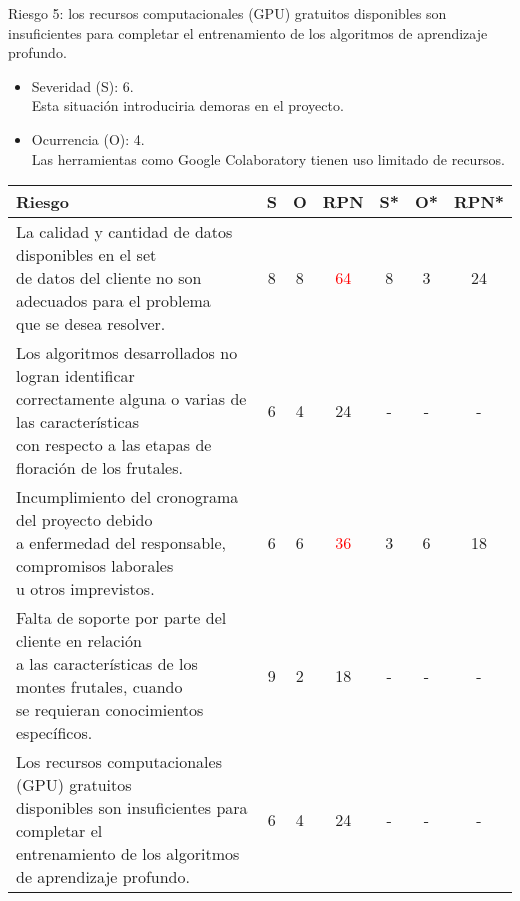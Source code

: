\documentclass[
11pt, %
]{charter}
\begin{document}
Riesgo 5: los recursos computacionales (GPU) gratuitos disponibles son insuficientes para
completar el entrenamiento de los algoritmos de aprendizaje profundo.
\begin{itemize}
	\item Severidad (S):  6.\\
	Esta situación introduciria demoras en el proyecto.
	\item Ocurrencia (O): 4.\\
	Las herramientas como Google Colaboratory tienen uso limitado de recursos.
\end{itemize}


\begin{table}[htpb]
\centering
\begin{tabularx}{\linewidth}{@{}|X|c|c|c|c|c|c|@{}}
\hline
\rowcolor[HTML]{C0C0C0} 
    Riesgo & S & O & RPN & S* & O* & RPN* \\ \hline
    
    \makecell[l]{La calidad y cantidad de datos disponibles en el set \\ de datos del cliente no son adecuados para el problema \\ que se desea resolver.} & 8 & 8 & \textcolor{red}{64} & 8 & 3 & 24 \\ \hline
    
    \makecell[l]{Los algoritmos desarrollados no logran identificar \\ correctamente alguna o varias de las características \\ con respecto a las etapas de floración de los frutales.} & 6 & 4 & 24 & - & - & - \\ \hline
    
    \makecell[l]{Incumplimiento del cronograma del proyecto debido \\ a enfermedad del responsable, compromisos laborales \\ u otros imprevistos.} & 6 & 6 & \textcolor{red}{36}& 3 & 6 & 18 \\ \hline
    
    \makecell[l]{Falta de soporte por parte del cliente en relación \\ a las características de los montes frutales, cuando \\ se requieran conocimientos específicos.} & 9 & 2 & 18 & - & - & - \\ \hline
    
    \makecell[l]{Los recursos computacionales (GPU) gratuitos \\ disponibles son insuficientes para completar el \\ entrenamiento de los algoritmos de aprendizaje profundo.} & 6 & 4 & 24 & - & - & - \\ \hline
\end{tabularx}
\end{table}
\end{document}
